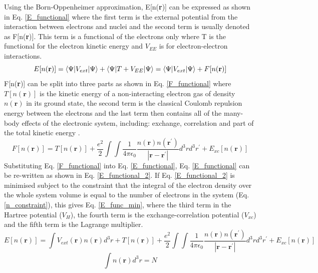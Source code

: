 \documentclass[11pt, twoside]{report}
\begin{document}
Using the Born-Oppenheimer approximation, E[n(\textbf{r})] can be expressed as shown in Eq. \ref{E_functional} where the first term is the external potential from the interaction between electrons and nuclei and the second term is usually denoted as F[n(\textbf{r})]. This term is a functional of the electrons only where T is the functional for the electron kinetic energy and $V_{EE}$ is for electron-electron interactions.
\begin{equation}\label{E_functional}
E[n(\mathbf{r})] = \braket{\Psi | V_{ext} | \Psi} +  \braket{\Psi | T + V_{EE} | \Psi} = \braket{\Psi | V_{ext} | \Psi} + F[n(\mathbf{r})]
\end{equation}
F[n(\textbf{r})] can be split into three parts as shown in Eq. \ref{F_functional} where $T[n(\mathbf{r})]$ is the kinetic energy of a non-interacting electron gas of density $n(\mathbf{r})$ in its ground state, the second term is the classical Coulomb repulsion energy between the electrons and the last term then contains all of the many-body effects of the electronic system, including: exchange, correlation and part of the total kinetic energy \cite{Prasad_ch3}.
\begin{equation}\label{F_functional}
F[n(\mathbf{r})] = T[n(\mathbf{r})] + \frac{e^2}{2}\int \int \frac{1}{4\pi \epsilon_0}\frac{n(\mathbf{r})n(\mathbf{r^{\prime}})}{|\mathbf{r} - \mathbf{r^{\prime}}|}d^3rd^3r^{\prime} + E_{xc}[n(\mathbf{r})]
\end{equation}
Substituting Eq. \ref{F_functional} into Eq. \ref{E_functional}, Eq. \ref{E_functional} can be re-written as shown in Eq. \ref{E_functional_2}. If Eq. \ref{E_functional_2} is minimised subject to the constraint that the integral of the electron density over the whole system volume is equal to the number of electrons in the system (Eq. \ref{n_constraint}), this gives Eq. \ref{E_func_min}, where the third term in the Hartree potential ($V_H$), the fourth term is the exchange-correlation potential ($V_{xc}$) and the fifth term is the Lagrange multiplier.
\begin{equation}\label{E_functional_2}
E[n(\mathbf{r})] = \int V_{ext}(\mathbf{r})n(\mathbf{r})d^3r + T[n(\mathbf{r})] + \frac{e^2}{2}\int \int \frac{1}{4\pi \epsilon_0}\frac{n(\mathbf{r})n(\mathbf{r^{\prime}})}{|\mathbf{r} - \mathbf{r^{\prime}}|}d^3rd^3r^{\prime} + E_{xc}[n(\mathbf{r})]
\end{equation}
\begin{equation}\label{n_constraint}
\int n(\mathbf{r})d^3r = N
\end{equation}
\end{document}
